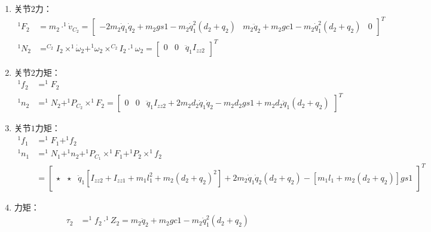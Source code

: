 \documentclass[
12pt, %
a4paper, 
oneside, %
headinclude,footinclude, %
]{scrartcl}
\begin{document}
{\begin{enumerate}
\begin{align*}
&= \begin{bmatrix} -\ddot{q}_1q_2 - 2\dot{q}_1\dot{q}_2 + gs1 & -\dot{q}_1^2q_2 + {\ddot{q}_2}^2 + gc1 & 0 \end{bmatrix}^T \\
^1\dot{v}_{C_2} &= ^1\dot{v}_2 + ^1\dot{\omega}_2 \times ^1P_{C_2} + ^1\omega_2 \times (^1\omega_2 \times ^1P_{C_2}) \\
&= \begin{bmatrix} -2\dot{q}_1\dot{q}_2 + gs1 - \ddot{q}_1(d_2 + q_2) & \ddot{q}_2 + gc1 - \dot{q}_1^2(d_2 + q_2) & 0 \end{bmatrix}^T
\end{align*}
\item 关节$ 2 $力：
\begin{align*}
^1F_2 &= m_2 \cdot ^1\dot{v}_{C_2} = \begin{bmatrix} -2m_2\dot{q}_1\dot{q}_2 + m_2gs1 - m_2\dot{q}_1^2(d_2 + q_2) & m_2\ddot{q}_2 + m_2gc1 - m_2\dot{q}_1^2(d_2 + q_2) & 0 \end{bmatrix}^T \\
^1N_2 &= ^{C_2}I_2 \times ^1\dot{\omega}_2 + ^1\omega_2 \times ^{C_2}I_2 \cdot ^1\omega_2 = \begin{bmatrix} 0 & 0 & \ddot{q}_1 I_{zz2} \end{bmatrix}^T
\end{align*}
\item 关节$ 2 $力矩：
\begin{align*}
^1f_2 &= ^1F_2 \\
^1n_2 &= ^1N_2 + ^1P_{C_2} \times ^1F_2 = \begin{bmatrix} 0 & 0 & \ddot{q}_1 I_{zz2} + 2m_2d_2\dot{q}_1\dot{q}_2 - m_2d_2gs1 + m_2d_2\ddot{q}_1(d_2 + q_2) \end{bmatrix}^T
\end{align*}
\item 关节$ 1 $力矩：
\begin{align*}
^1f_1 &= ^1F_1 + ^1f_2 \\
^1n_1 &= ^1N_1 + ^1n_2 + ^1P_{C_1} \times ^1F_1 + ^1P_2 \times ^1f_2 \\
&= \begin{bmatrix} \star & \star & \ddot{q}_1[I_{zz2} + I_{zz1} + m_1l_1^2 + m_2(d_2 + q_2)^2] + 2m_2\dot{q}_1\dot{q}_2(d_2 + q_2) - [m_1l_1 + m_2(d_2 + q_2)]gs1 \end{bmatrix}^T
\end{align*}
\item 力矩：
\begin{align*}
\tau_2 &= ^1f_2 \cdot ^1Z_2 = m_2\ddot{q}_2 + m_2gc1 - m_2\dot{q}_1^2(d_2 + q_2) \\

\end{align*}
\end{enumerate}}
\end{document}
